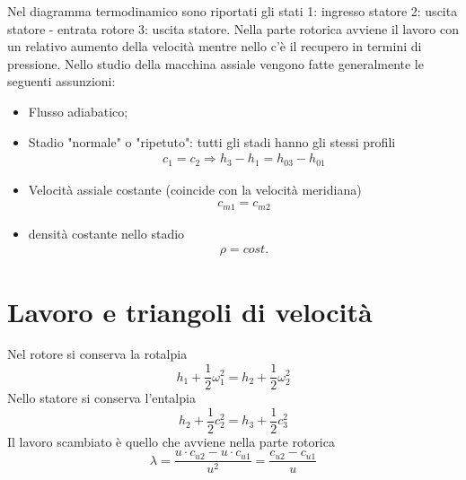 Nel diagramma termodinamico sono riportati gli stati 1: ingresso statore 2: uscita statore - entrata rotore 3: uscita statore. Nella parte rotorica avviene il lavoro con un relativo aumento della velocità mentre nello c'è il recupero in termini di pressione. Nello studio della macchina assiale vengono fatte generalmente le seguenti assunzioni:
\begin{itemize}
\item Flusso adiabatico;
\item Stadio "normale" o "ripetuto": tutti gli stadi hanno gli stessi profili
\begin{align*}
c_1 = c_2 \Rightarrow h_3-h_1 = h_{03} - h_{01}
\end{align*}
\item Velocità assiale costante (coincide con la velocità meridiana)
\begin{align*}
c_{m1} = c_{m2}
\end{align*}
\item densità costante nello stadio
\begin{align*}
\rho = cost. 
\end{align*}
\end{itemize}

\section{Lavoro e triangoli di velocità}
Nel rotore si conserva la rotalpia
\begin{equation}
h_1 + \frac{1}{2} \omega_1^2 = h_2 + \frac{1}{2} \omega_2^2
\end{equation}
Nello statore si conserva l'entalpia
\begin{equation}
h_2 + \frac{1}{2} c_2^2 = h_3 + \frac{1}{2} c_3^2
\end{equation}
Il lavoro scambiato è quello che avviene nella parte rotorica
\begin{equation}
\lambda = \frac{u \cdot c_{u2} - u \cdot c_{u1}}{u^2} = \frac{c_{u2} - c_{u1}}{u}
\end{equation}


